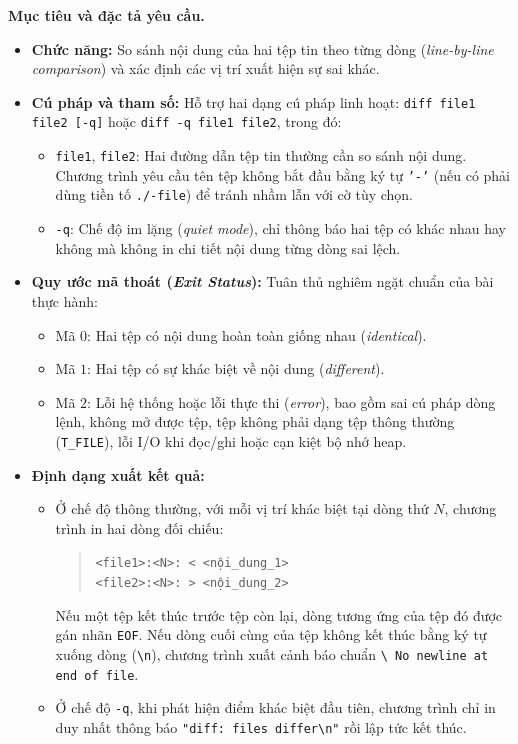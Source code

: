 \documentclass[12pt,a4paper]{article}
\begin{document}
\textbf{Mục tiêu và đặc tả yêu cầu.}
\begin{itemize}
  \item \textbf{Chức năng:} So sánh nội dung của hai tệp tin theo từng dòng (\textit{line-by-line comparison}) và xác định các vị trí xuất hiện sự sai khác.
  \item \textbf{Cú pháp và tham số:} Hỗ trợ hai dạng cú pháp linh hoạt: \texttt{diff file1 file2 [-q]} hoặc \texttt{diff -q file1 file2}, trong đó:
  \begin{itemize}
    \item \texttt{file1}, \texttt{file2}: Hai đường dẫn tệp tin thường cần so sánh nội dung. Chương trình yêu cầu tên tệp không bắt đầu bằng ký tự \texttt{'-'} (nếu có phải dùng tiền tố \texttt{./-file}) để tránh nhầm lẫn với cờ tùy chọn.
    \item \texttt{-q}: Chế độ im lặng (\textit{quiet mode}), chỉ thông báo hai tệp có khác nhau hay không mà không in chi tiết nội dung từng dòng sai lệch.
  \end{itemize}
  \item \textbf{Quy ước mã thoát (\textit{Exit Status}):} Tuân thủ nghiêm ngặt chuẩn của bài thực hành:
  \begin{itemize}
    \item Mã $0$: Hai tệp có nội dung hoàn toàn giống nhau (\textit{identical}).
    \item Mã $1$: Hai tệp có sự khác biệt về nội dung (\textit{different}).
    \item Mã $2$: Lỗi hệ thống hoặc lỗi thực thi (\textit{error}), bao gồm sai cú pháp dòng lệnh, không mở được tệp, tệp không phải dạng tệp thông thường (\texttt{T\_FILE}), lỗi I/O khi đọc/ghi hoặc cạn kiệt bộ nhớ heap.
  \end{itemize}
  \item \textbf{Định dạng xuất kết quả:}
  \begin{itemize}
    \item Ở chế độ thông thường, với mỗi vị trí khác biệt tại dòng thứ $N$, chương trình in hai dòng đối chiếu:
    \begin{quote}
      \texttt{<file1>:<N>: < <nội\_dung\_1>}\\
      \texttt{<file2>:<N>: > <nội\_dung\_2>}
    \end{quote}
    Nếu một tệp kết thúc trước tệp còn lại, dòng tương ứng của tệp đó được gán nhãn \texttt{EOF}. Nếu dòng cuối cùng của tệp không kết thúc bằng ký tự xuống dòng (\texttt{\textbackslash n}), chương trình xuất cảnh báo chuẩn \texttt{\textbackslash\ No newline at end of file}.
    \item Ở chế độ \texttt{-q}, khi phát hiện điểm khác biệt đầu tiên, chương trình chỉ in duy nhất thông báo \texttt{"diff: files differ\textbackslash n"} rồi lập tức kết thúc.
  \end{itemize}
\end{itemize}
\end{document}
